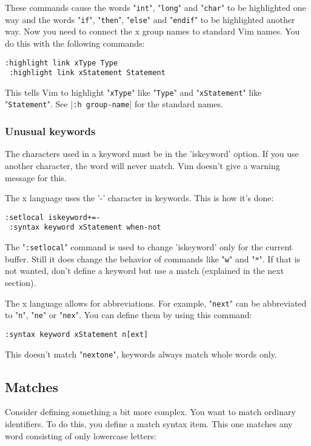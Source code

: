 These commands cause the words "\verb!int!", "\verb!long!" and "\verb!char!" to be highlighted one way and the words "\verb!if!", "\verb!then!", "\verb!else!" and "\verb!endif!" to be highlighted another way.
Now you need to connect the x group names to standard Vim names.
You do this with the following commands:

\begin{Verbatim}[samepage=true]
 :highlight link xType Type
 :highlight link xStatement Statement
\end{Verbatim}

This tells Vim to highlight "\verb!xType!" like "\verb!Type!" and "\verb!xStatement!" like "\verb!Statement!".
See |\verb!:h group-name!| for the standard names.

\subsubsection{Unusual keywords}
The characters used in a keyword must be in the 'iskeyword' option.
If you use another character, the word will never match.
Vim doesn't give a warning message for this.

The x language uses the '-' character in keywords.
This is how it's done:

\begin{Verbatim}[samepage=true]
 :setlocal iskeyword+=-
 :syntax keyword xStatement when-not
\end{Verbatim}

The "\verb!:setlocal!" command is used to change 'iskeyword' only for the current buffer.
Still it does change the behavior of commands like "\verb!w!" and "\verb!*!".
If that is not wanted, don't define a keyword but use a match (explained in the next section).

The x language allows for abbreviations.
For example, "\verb!next!" can be abbreviated to "\verb!n!", "\verb!ne!" or "\verb!nex!".
You can define them by using this command:

\begin{Verbatim}[samepage=true]
 :syntax keyword xStatement n[ext]
\end{Verbatim}

This doesn't match "\verb!nextone!", keywords always match whole words only.
\subsection{Matches}
Consider defining something a bit more complex.
You want to match ordinary identifiers.
To do this, you define a match syntax item.
This one matches any word consisting of only lowercase letters:

